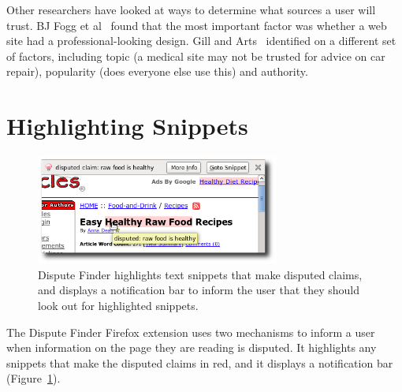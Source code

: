\documentclass{www2010-submission}
\newcommand{\todo}[1]{}
\begin{document}
\todo{Cite Pew Research study saying people like to read news that supports their own point of view, but many others like neutral sources. http://people-press.org/report/?pageid=1353}

Other researchers have looked at ways to determine what sources a user will trust. 
BJ Fogg et al~\cite{Fogg2003} found that the most important factor was whether a web site had a professional-looking design. Gill and Arts~\cite{Gil2006} identified on a different set of factors, including topic (a medical site may not be trusted for advice on car repair), popularity (does everyone else use this) and authority.


\section{Highlighting Snippets}



\begin{figure}[tb]
	\begin{center}
	\includegraphics[width=8cm]{pictures/highlight_bar.png}
	\caption{Dispute Finder highlights text snippets that make disputed claims, and displays a notification bar to inform the user that they should look out for highlighted snippets.}
	\label{highlight_bar}
	\end{center}
\end{figure}

%
%

The Dispute Finder Firefox extension uses two mechanisms to inform a user when information on the page they are reading is disputed. It highlights any snippets that make the disputed claims in red, and it displays a notification bar (Figure~\ref{highlight_bar}). 
\end{document}
